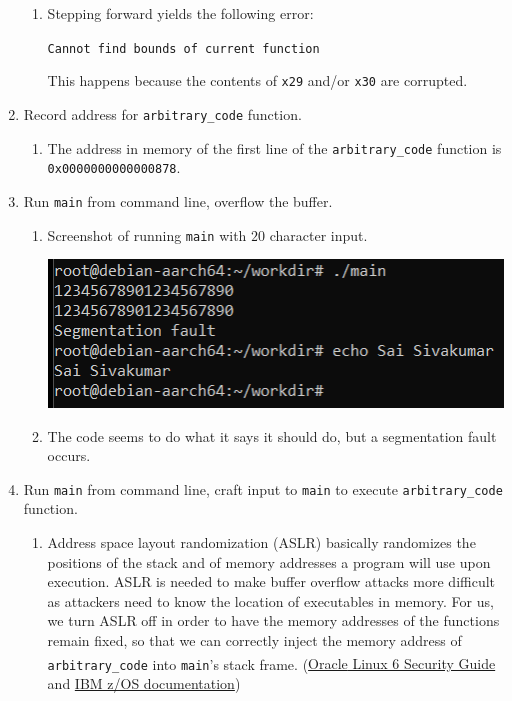 \documentclass[11pt]{article}
\newcommand{\fn}[1]{\texttt{#1}}
\begin{document}
\begin{enumerate}[left = \parindent, label=\textbf{Task \arabic* -}]
\begin{enumerate}
        \item Stepping forward yields the following error:
        \begin{center}
            \fn{Cannot find bounds of current function}
        \end{center}
        This happens because the contents of \fn{x29} and/or \fn{x30} are corrupted.
    \end{enumerate}
    \item Record address for \fn{arbitrary\_code} function. \begin{enumerate}
        \item The address in memory of the first line of the \fn{arbitrary\_code} function is \fn{0x0000000000000878}.
    \end{enumerate}
    \item Run \fn{main} from command line, overflow the buffer. \begin{enumerate}
        \item Screenshot of running \fn{main} with $20$ character input.
        \begin{center}
            \includegraphics[scale=0.85]{segfault.png}
        \end{center}
        \item The code seems to do what it says it should do, but a segmentation fault occurs.
    \end{enumerate}
    \item Run \fn{main} from command line, craft input to \fn{main} to execute \fn{arbitrary\_code} function. \begin{enumerate}
        \item Address space layout randomization (ASLR) basically randomizes the positions of the stack and of memory addresses a program will use upon execution. ASLR is needed to make buffer overflow attacks more difficult as attackers need to know the location of executables in memory. For us, we turn ASLR off in order to have the memory addresses of the functions remain fixed, so that we can correctly inject the memory address of \fn{arbitrary\_code} into \fn{main}'s stack frame. (\href{https://docs.oracle.com/en/operating-systems/oracle-linux/6/security/ol_aslr_sec.html}{Oracle\textsuperscript{\tiny\textregistered} Linux 6 Security Guide} and \href{https://www.ibm.com/docs/en/zos/3.1.0?topic=overview-address-space-layout-randomization}{IBM z/OS documentation})

\end{enumerate}
\end{enumerate}
\end{document}
